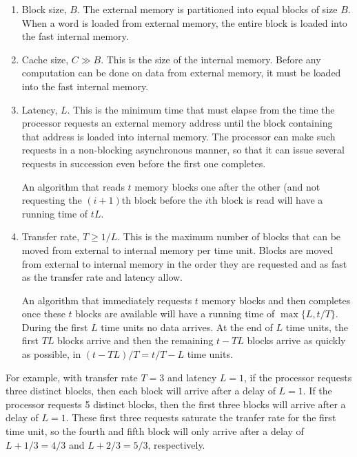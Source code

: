 \documentclass{patmorin}
\begin{document}
\begin{enumerate}

  \item Block size, $B$. The external memory is partitioned into equal
    blocks of size $B$. When a word is loaded from external memory,
    the entire block is loaded into the fast internal memory.

  \item Cache size, $C \gg B$.  This is the size of the internal
    memory. Before any computation can be done on data from external
    memory, it must be loaded into the fast internal memory.

  \item Latency, $L$. This is the minimum time that must elapse from the
    time the processor requests an external memory address until the block
    containing that address is loaded into internal memory.  The processor
    can make such requests in a non-blocking asynchronous manner, so that
    it can issue several requests in succession even before the first one
    completes.

    An algorithm that reads $t$ memory blocks one after the other (and
    not requesting the $(i+1)$th block before the $i$th block is read
    will have a running time of $tL$.

  \item Transfer rate, $T \ge 1/L$.  This is the maximum number of
    blocks that can be moved from external to internal memory per time
    unit.  Blocks are moved from external to internal memory in the order
    they are requested and as fast as the transfer rate and latency allow.

    An algorithm that immediately requests $t$ memory blocks and then
    completes once these $t$ blocks are available will have a running
    time of $\max\{L,t/T\}$.  During the first $L$ time units no data
    arrives. At the end of $L$ time units, the first $TL$ blocks arrive
    and then the remaining $t-TL$ blocks arrive as quickly as possible,
    in $(t-TL)/T=t/T -L$ time units.

\end{enumerate}

For example, with transfer rate $T=3$ and latency $L=1$, if the processor
requests three distinct blocks, then each block will arrive after a
delay of $L=1$.  If the processor requests 5 distinct blocks, then
the first three blocks will arrive after a delay of $L=1$. These first
three requests saturate the tranfer rate for the first time unit, so
the fourth and fifth block will only arrive after a delay of $L+1/3=4/3$
and $L+2/3=5/3$, respectively.
\end{document}
